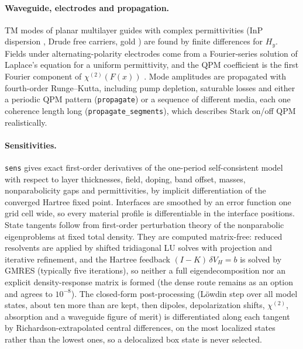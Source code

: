 \documentclass[11pt]{article}
\newcommand{\chitwo}{\chi^{(2)}}
\newcommand{\code}[1]{\texttt{#1}}
\begin{document}
\paragraph{Waveguide, electrodes and propagation.} TM modes of planar multilayer guides with complex permittivities (InP dispersion \cite{Pettit1965}, Drude free carriers, gold \cite{Ordal1985}) are found by finite differences for $H_y$. Fields under alternating-polarity electrodes come from a Fourier-series solution of Laplace's equation for a uniform permittivity, and the QPM coefficient is the first Fourier component of $\chitwo(F(x))$ \cite{Fejer1992}. Mode amplitudes are propagated with fourth-order Runge--Kutta, including pump depletion, saturable losses and either a periodic QPM pattern (\code{propagate}) or a sequence of different media, each one coherence length long (\code{propagate\_segments}), which describes Stark on/off QPM realistically.

\paragraph{Sensitivities.} \code{sens} gives exact first-order derivatives of the one-period self-consistent model with respect to layer thicknesses, field, doping, band offset, masses, nonparabolicity gaps and permittivities, by implicit differentiation of the converged Hartree fixed point. Interfaces are smoothed by an error function one grid cell wide, so every material profile is differentiable in the interface positions. State tangents follow from first-order perturbation theory of the nonparabolic eigenproblems at fixed total density. They are computed matrix-free: reduced resolvents are applied by shifted tridiagonal LU solves with projection and iterative refinement, and the Hartree feedback $(I-K)\,\delta V_H=b$ is solved by GMRES (typically five iterations), so neither a full eigendecomposition nor an explicit density-response matrix is formed (the dense route remains as an option and agrees to $10^{-8}$). The closed-form post-processing (L\"owdin step over all model states, about ten more than are kept, then dipoles, depolarization shifts, $\chitwo$, absorption and a waveguide figure of merit) is differentiated along each tangent by Richardson-extrapolated central differences, on the most localized states rather than the lowest ones, so a delocalized box state is never selected.
\end{document}
